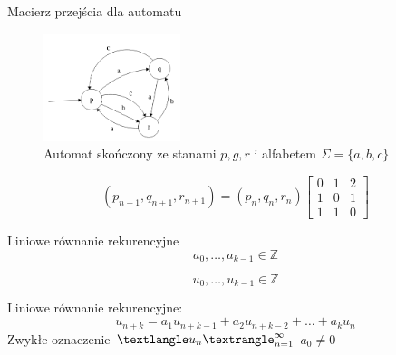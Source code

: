 \documentclass[handout]{beamer}
\theoremstyle{definition}
\theoremstyle{named}
\begin{document}
\begin{frame}{Macierz przejścia dla automatu}
\begin{figure}
    \centering
    \includegraphics[width=40mm]{img/automat.png}
    \caption{Automat skończony ze stanami $p, g, r$ i alfabetem $\Sigma = \{a,b,c \}$}
    \label{fig:my_label}
\end{figure}
    $$
    (p_{n+1}, q_{n+1}, r_{n+1}) 
    = (p_{n},q_{n},r_{n}) \begin{bmatrix}
    0 & 1 & 2 \\
    1 & 0 & 1 \\
    1 & 1 & 0
    \end{bmatrix}
    $$
\end{frame}

\begin{frame}{Liniowe równanie rekurencyjne}
    $$
        a_0, \ldots, a_{k-1} \in \mathbb{Z} 
    $$

    $$
        u_0, \ldots, u_{k-1} \in \mathbb{Z}
    $$


    Liniowe równanie rekurencyjne: 
    $$
    u_{n+k}=a_{1} u_{n+k-1}+a_{2} u_{n+k-2}+\ldots+a_{k} u_{n}
    $$
    Zwykłe oznaczenie $\textlangle u_n \textrangle _{n=1}^{\infty}$
    $a_0 \neq 0$
\end{frame}
\end{document}
